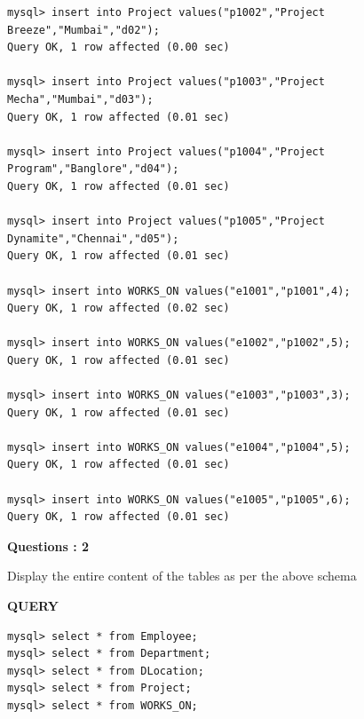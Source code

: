 \documentclass[a4paper,12pt]{report}
\begin{document}
\begin{verbatim}
mysql> insert into Project values("p1002","Project Breeze","Mumbai","d02");
Query OK, 1 row affected (0.00 sec)

mysql> insert into Project values("p1003","Project Mecha","Mumbai","d03");
Query OK, 1 row affected (0.01 sec)

mysql> insert into Project values("p1004","Project Program","Banglore","d04");
Query OK, 1 row affected (0.01 sec)

mysql> insert into Project values("p1005","Project Dynamite","Chennai","d05");
Query OK, 1 row affected (0.01 sec)

mysql> insert into WORKS_ON values("e1001","p1001",4);
Query OK, 1 row affected (0.02 sec)

mysql> insert into WORKS_ON values("e1002","p1002",5);
Query OK, 1 row affected (0.01 sec)

mysql> insert into WORKS_ON values("e1003","p1003",3);
Query OK, 1 row affected (0.01 sec)

mysql> insert into WORKS_ON values("e1004","p1004",5);
Query OK, 1 row affected (0.01 sec)

mysql> insert into WORKS_ON values("e1005","p1005",6);
Query OK, 1 row affected (0.01 sec)
\end{verbatim}

\begin{flushleft}
    \textbf{Questions : 2}
\end{flushleft}
Display the entire content of the tables as per the above schema
\begin{flushleft}
		\textbf{QUERY }
	\end{flushleft}
\begin{verbatim}
mysql> select * from Employee;
mysql> select * from Department;
mysql> select * from DLocation;
mysql> select * from Project;
mysql> select * from WORKS_ON;
\end{verbatim}
\end{document}
